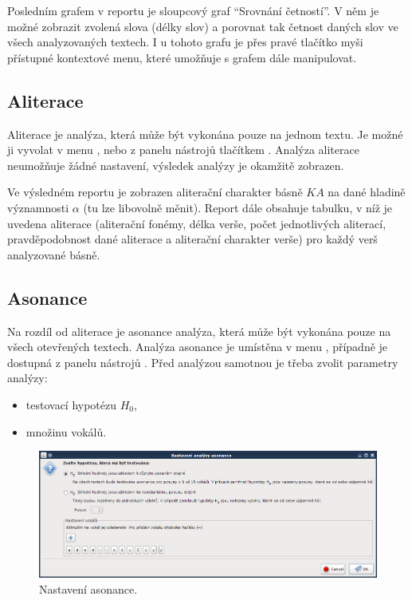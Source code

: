 \documentclass[dp.tex]{subfiles}
\begin{document}
Posledním grafem v reportu je sloupcový graf \enquote{Srovnání četností}. V něm je možné zobrazit zvolená slova (délky slov) a porovnat tak četnost daných slov ve všech analyzovaných textech. I u tohoto grafu je přes pravé tlačítko myši přístupné kontextové menu, které umožňuje s grafem dále manipulovat.

\subsection{Aliterace}

Aliterace je analýza, která může být vykonána pouze na jednom textu. Je možné ji vyvolat v menu , nebo z panelu nástrojů tlačítkem . Analýza aliterace neumožňuje žádné nastavení, výsledek analýzy je okamžitě zobrazen. 

Ve výsledném reportu je zobrazen aliterační charakter básně $\mathit{KA}$ na dané hladině významnosti $\alpha$ (tu lze libovolně měnit). Report dále obsahuje tabulku, v níž je uvedena aliterace (aliterační fonémy, délka verše, počet jednotlivých aliterací, pravděpodobnost dané aliterace a aliterační charakter verše) pro každý verš analyzované básně.
	
\subsection{Asonance}

Na rozdíl od aliterace je asonance analýza, která může být vykonána pouze na všech otevřených textech. Analýza asonance je umístěna v menu , případně je dostupná z panelu nástrojů . Před analýzou samotnou je třeba zvolit parametry analýzy:
\begin{itemize}
\item testovací hypotézu $H_0$,
\item množinu vokálů.
\end{itemize}

\begin{figure}[H]
\centering
\includegraphics[max width=\textwidth,keepaspectratio=true]{imgs-60-aplikace/gui-asonance-settings}
\caption{Nastavení asonance.}
\label{fig:gui-asonance-settings}
\end{figure}
\end{document}
